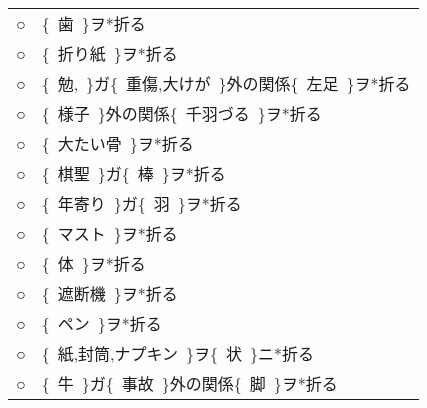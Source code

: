 \documentclass[fleqn]{nlp}
\newcommand{\sm}[1]{}
\begin{document}
\begin{table}
\begin{tabular}{lp{13cm}}
 ○ & \{~歯~\}ヲ*\hspace{0.8em}折る\hspace{0.8em}  \\
 ○ & \{~折り紙~\}ヲ*\hspace{0.8em}折る\hspace{0.8em}  \\
 ○ & \{~勉,\sm{数量}~\}ガ\hspace{0.8em}\{~重傷,大けが~\}外の関係\hspace{0.8em}\{~左足~\}ヲ*\hspace{0.8em}折る\hspace{0.8em}  \\
 ○ & \{~様子~\}外の関係\hspace{0.8em}\{~千羽づる~\}ヲ*\hspace{0.8em}折る\hspace{0.8em}  \\
 ○ & \{~大たい骨~\}ヲ*\hspace{0.8em}折る\hspace{0.8em}  \\
 ○ & \{~棋聖~\}ガ\hspace{0.8em}\{~棒~\}ヲ*\hspace{0.8em}折る\hspace{0.8em}  \\
 ○ & \{~年寄り~\}ガ\hspace{0.8em}\{~\sm{数量}羽~\}ヲ*\hspace{0.8em}折る\hspace{0.8em} \\
 ○ & \{~マスト~\}ヲ*\hspace{0.8em}折る\hspace{0.8em} \\
 ○ & \{~体~\}ヲ*\hspace{0.8em}折る\hspace{0.8em} \\
 ○ & \{~遮断機~\}ヲ*\hspace{0.8em}折る\hspace{0.8em} \\
 ○ & \{~ペン~\}ヲ*\hspace{0.8em}折る\hspace{0.8em} \\
 ○ & \{~紙,封筒,ナプキン~\}ヲ\hspace{0.8em}\{~状~\}ニ*\hspace{0.8em}折る\hspace{0.8em}  \\
 ○ & \{~牛~\}ガ\hspace{0.8em}\{~事故~\}外の関係\hspace{0.8em}\{~脚~\}ヲ*\hspace{0.8em}折る\hspace{0.8em} \\ \hline
 \end{tabular}
\end{table}
\end{document}
